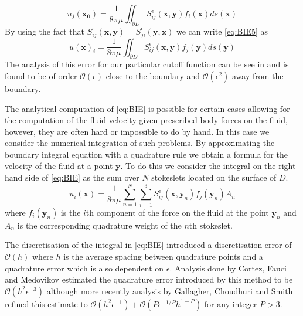 \begin{equation}
    u_j(\bm{x_0}) = \frac{1}{8 \pi \mu} \iint_{\partial D} S_{i j}^{\epsilon}\left(\bm{x}, \bm{y}\right) f_{i}(\bm{x}) d s(\bm{x})
\end{equation}
By using the fact that $S_{i j}^{\epsilon}\left(\bm{x}, \bm{y}\right) = S_{j i}^{\epsilon}\left(\bm{y}, \bm{x}\right)$ we can write \cref{eq:BIE5} as 
\begin{equation}
  \label{eq:BIE}
    u(\bm{x})_i=\frac{1}{8 \pi \mu} \iint_{\partial D} S_{i j}^{\epsilon}\left(\bm{x}, \bm{y}\right) f_{j}(\bm{y}) d s(\bm{y})
\end{equation}
The analysis of this error for our particular cutoff function can be see in \cite{Cortez2005} and is found to be of order $\mathcal{O}(\epsilon)$ close to the boundary and $\mathcal{O}(\epsilon^2)$ away from the boundary.

The analytical computation of \cref{eq:BIE} is possible for certain cases allowing for the computation of the fluid velocity given prescribed body forces on the fluid, however, they are often hard or impossible to do by hand. In this case we consider the numerical integration of such problems. By approximating the boundary integral equation with a quadrature rule we obtain a formula for the velocity of the fluid at a point $\bm{y}$. To do this we consider the integral on the right-hand side of \cref{eq:BIE} as the sum over $N$ stokeslets located on the surface of $D$. 
\begin{equation}
\label{eq:Stokesletsum}
    u_{i}\left(\bm{x}\right)=\frac{1}{8 \pi \mu} \sum_{n=1}^{N} \sum_{i=1}^{3} S_{i j}^{\epsilon}\left(\bm{x}, {\bm{y}}_{n}\right) {f}_{j}({\bm{y}}_{n}) A_{n}
\end{equation}
where ${f}_{i}({\bm{y}}_n)$ is the $i$th component of the force on the fluid at the point ${\bm{y}}_n$ and $A_n$ is the corresponding quadrature weight of the $n$th stokeslet.

The discretisation of the integral in \cref{eq:BIE} introduced a discretisation error of $\mathcal{O}(h)$ where $h$ is the average spacing between quadrature points and a quadrature error which is also dependent on $\epsilon$. Analysis done by Cortez, Fauci and Medovikov \cite{Cortez2005} estimated the quadrature error introduced by this method to be $\mathcal{O}(h^2\epsilon^{-3})$ although more recently analysis by Gallagher, Choudhuri and Smith \cite{Gallagher2019SharpEquation} refined this estimate to $\mathcal{O}(h^2\epsilon^{-1}) + \mathcal{O}(P\epsilon^{-1/P} h^{1-P})$ for any integer $P>3$.


